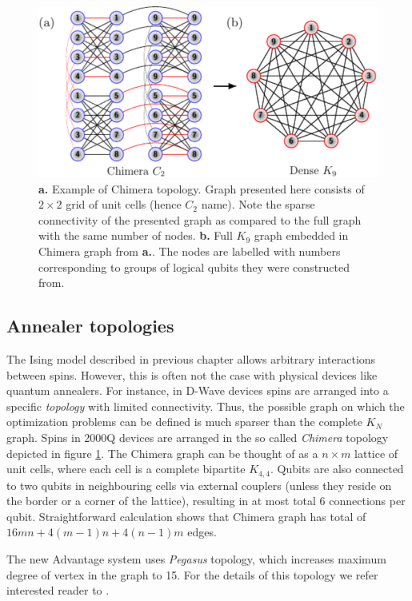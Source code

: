 \begin{figure}[h]
    \centering
    \includegraphics[width=\textwidth]{figures/chimera.pdf}
    \caption{\textbf{a.} Example of Chimera topology. Graph presented here consists of $2 \times 2$ grid of unit cells (hence $C_2$ name). Note the sparse connectivity of the presented graph as compared to the full graph with the same number of nodes. \textbf{b.} Full $K_9$ graph embedded in Chimera graph from \textbf{a.}. The nodes are labelled with numbers corresponding to groups of logical qubits they were constructed from.}
    \label{fig:chimera}
\end{figure}


\subsection{Annealer topologies}

The Ising model described in previous chapter allows arbitrary interactions between spins. However, this is often not the case with physical devices like quantum annealers. For instance, in D-Wave devices spins are arranged into a specific \emph{topology} with limited connectivity. Thus, the possible graph on which the optimization problems can be defined is much sparser than the complete $K_{N}$ graph. Spins in 2000Q devices are arranged in the so called \emph{Chimera} topology depicted in figure \ref{fig:chimera}. The Chimera graph can be thought of as a $n \times m$ lattice of unit cells, where each cell is a complete bipartite $K_{4,4}$. Qubits are also connected to two qubits in neighbouring cells via external couplers (unless they reside on the border or a corner of the lattice), resulting in at most total 6 connections per qubit. Straightforward calculation shows that Chimera graph has total of $16mn + 4(m-1)n + 4(n-1)m$ edges.

The new Advantage system uses \emph{Pegasus} topology, which increases maximum degree of vertex in the graph to 15. For the details of this topology we refer interested reader to \cite{boothby}.

